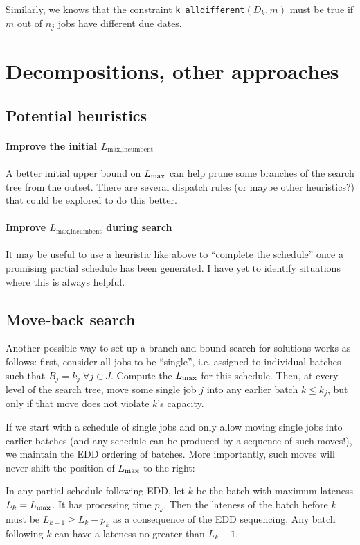 Similarly, we knows that the constraint \texttt{k\_alldifferent}$(D_k, m)$ must
be true if $m$ out of $n_j$ jobs have different due dates.

\section{Decompositions, other approaches}
\subsection{Potential heuristics}
\paragraph{Improve the initial $L_{\text{max,incumbent}}$} A better initial
upper bound on $L_{\text{max}}$ can help prune some branches of the search tree from the
outset. There are several dispatch rules (or maybe other heuristics?) that could
be explored to do this better.
\paragraph{Improve $L_{\text{max,incumbent}}$ during search} It may be useful to
use a heuristic like above to ``complete the schedule'' once a promising partial
schedule has been generated. I have yet to identify situations where this is
always helpful.

\subsection{Move-back search}

Another possible way to set up a branch-and-bound search for solutions works as
follows: first, consider all jobs to be ``single'', i.e. assigned to individual
batches such that $B_j = k_j \; \forall j \in J$. Compute the $L_{\text{max}}$ for this
schedule. Then, at every level of the search tree, move some single job $j$ into any
earlier batch $k \leq k_j$, but only if that move does not violate $k$'s
capacity. 

If we start with a schedule of single jobs and only allow moving single jobs
into earlier batches (and any schedule can be produced by a sequence of such
moves!), we maintain the EDD ordering of batches. More importantly, such moves
will never shift the position of $L_{\text{max}}$ to the right:

In any partial schedule following EDD, let $k$ be the batch
with maximum lateness $L_k = L_{\text{max}}$. It has processing time $p_k$. Then the lateness of the
batch before $k$ must be $L_{k-1} \geq L_k - p_k$ as a consequence of the EDD
sequencing. Any batch following $k$ can have a lateness no greater than $L_k -
1$.

